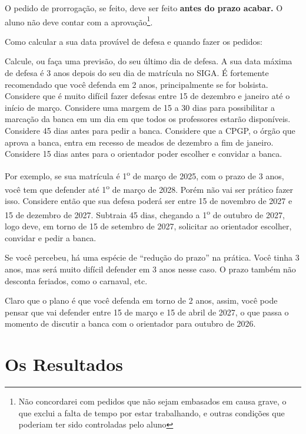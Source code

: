 O pedido de prorrogação, se feito, deve ser feito \textbf{antes do prazo acabar.} O aluno não deve contar com a aprovação\footnote{Não concordarei com pedidos que não sejam embasados em causa grave, o que exclui a falta de tempo por estar trabalhando, e outras condições que poderiam ter sido controladas pelo aluno}.


Como calcular a sua data provável de defesa e quando fazer os pedidos:
\begin{outline}
    \1 Calcule, ou faça uma previsão, do seu último dia de defesa.
    \2 A sua data máxima de defesa é 3 anos depois do seu dia de matrícula no SIGA.
    \2 É fortemente recomendado que você defenda em 2 anos, principalmente se for bolsista.
    \1 Considere que é muito difícil fazer defesas entre 15 de dezembro e janeiro até o início de março.
    \1 Considere uma margem de 15 a 30 dias para possibilitar a marcação da banca em um dia em que todos os professores estarão disponíveis.
    \1 Considere 45 dias antes para pedir a banca.
    \2 Considere que a CPGP, o órgão que aprova a banca, entra em recesso de meados de dezembro a fim de janeiro.
    \1 Considere 15 dias antes para o orientador poder escolher e convidar a banca.
\end{outline}

Por exemplo, se sua matrícula é 1\textsuperscript{o} de março de 2025, com o prazo de 3 anos, você tem que defender até 1\textsuperscript{o} de março de 2028. Porém não vai ser prático fazer isso. Considere então que sua defesa poderá ser entre 15 de novembro de 2027 e 15 de dezembro de 2027. Subtraia 45 dias, chegando a 1\textsuperscript{o} de outubro de 2027, logo deve, em torno de 15 de setembro de 2027, solicitar ao orientador escolher, convidar e pedir a banca.

Se você percebeu, há uma espécie de ``redução do prazo'' na prática. Você tinha 3 anos, mas será muito difícil defender em 3 anos nesse caso. O prazo também não desconta feriados, como o carnaval, etc.

Claro que o plano é que você defenda em torno de 2 anos, assim, você pode pensar que vai defender entre 15 de março e 15 de abril de 2027, o que passa o momento de discutir a banca com o orientador para outubro de 2026.



\section{Os Resultados}


